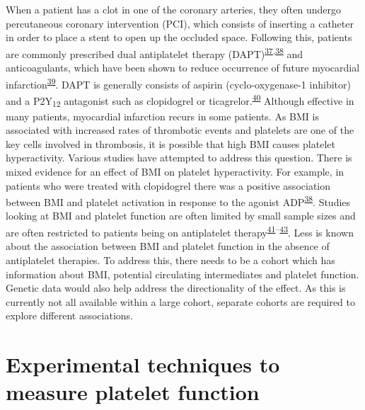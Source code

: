 \documentclass[11pt,twoside]{bristolthesis}
\begin{document}
When a patient has a clot in one of the coronary arteries, they often undergo percutaneous coronary intervention (PCI), which consists of inserting a catheter in order to place a stent to open up the occluded space. Following this, patients are commonly prescribed dual antiplatelet therapy (DAPT)\textsuperscript{\protect\hyperlink{ref-Freynhofer2017a}{37},\protect\hyperlink{ref-Nardin2015}{38}} and anticoagulants, which have been shown to reduce occurrence of future myocardial infarction\textsuperscript{\protect\hyperlink{ref-Khan2020}{39}}. DAPT is generally consists of aspirin (cyclo-oxygenase-1 inhibitor) and a P2Y\textsubscript{12} antagonist such as clopidogrel or ticagrelor.\textsuperscript{\protect\hyperlink{ref-Degrauwe2017}{40}} Although effective in many patients, myocardial infarction recurs in some patients. As BMI is associated with increased rates of thrombotic events and platelets are one of the key cells involved in thrombosis, it is possible that high BMI causes platelet hyperactivity. Various studies have attempted to address this question. There is mixed evidence for an effect of BMI on platelet hyperactivity. For example, in patients who were treated with clopidogrel there was a positive association between BMI and platelet activation in response to the agonist ADP\textsuperscript{\protect\hyperlink{ref-Nardin2015}{38}}. Studies looking at BMI and platelet function are often limited by small sample sizes and are often restricted to patients being on antiplatelet therapy\textsuperscript{\protect\hyperlink{ref-Deharo2014}{41}--\protect\hyperlink{ref-Pankert2014}{43}}. Less is known about the association between BMI and platelet function in the absence of antiplatelet therapies. To address this, there needs to be a cohort which has information about BMI, potential circulating intermediates and platelet function. Genetic data would also help address the directionality of the effect. As this is currently not all available within a large cohort, separate cohorts are required to explore different associations.

\hypertarget{platelet-function-techniques}{%
\section{Experimental techniques to measure platelet function}\label{platelet-function-techniques}}
\end{document}

